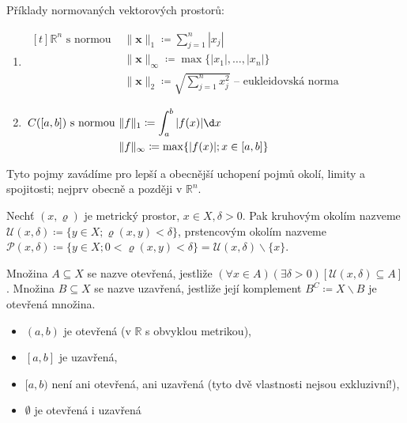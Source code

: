 \begin{priklad} Příklady normovaných vektorových prostorů:
  \begin{enumerate}[1)]
  \item \,$\begin{aligned}[t]\mathbb R^n \text{ s normou } &\|\textbf{x}\|_1\coloneq\sum_{j=1}^{n}|x_j| \\ &\|\textbf{x}\|_\infty \coloneq \max \{|x_1|, \dots, |x_n|\}\\ &\|\textbf{x}\|_2 \coloneq \sqrt{\sum_{j=1}^{n}x_j^2} \text{ -- eukleidovská norma}\end{aligned}$
      \item \,$\begin{aligned}[t]C([a, b])\text{ s normou } & \|f\|_1 \coloneq \int_{a}^{b}|f(x)| \d x \\ & \|f\|_\infty \coloneq \max\{|f(x)|; x \in [a, b]\} \end{aligned}$
  \end{enumerate}
\end{priklad}

\begin{poznamka}
    Tyto pojmy zavádíme pro lepší a obecnější uchopení pojmů okolí, limity a spojitosti; nejprv obecně a později v $\mathbb R^n$.
\end{poznamka}

\begin{definice}
    Nechť $(x, \varrho)$ je metrický prostor, $x \in X, \delta >0$. Pak kruhovým okolím nazveme $\mathscr U(x, \delta)\coloneq \{y \in X; \varrho (x, y) < \delta\}$, prstencovým okolím nazveme $\mathscr P(x, \delta)\coloneq\{y \in X; 0 <\varrho (x, y)< \delta\} = \mathscr U(x, \delta)\smallsetminus \{x\}$.
\end{definice}

\begin{definice}
    Množina $A \subseteq X$ se nazve otevřená, jestliže $(\forall x \in A)(\exists \delta>0)\left[\mathscr U(x, \delta)\subseteq A\right]$. Množina $B \subseteq X$ se nazve uzavřená, jestliže její komplement $B^C\coloneq X \smallsetminus B$ je otevřená množina.
\end{definice}

\begin{priklad}
  \begin{itemize}
      \item $(a, b)$ je otevřená (v $\mathbb R$ s obvyklou metrikou),
      \item $[a, b]$ je uzavřená,
      \item $[a, b)$ není ani otevřená, ani uzavřená (tyto dvě vlastnosti nejsou exkluzivní!),
      \item $\emptyset$ je otevřená i uzavřená
  \end{itemize}
\end{priklad}

